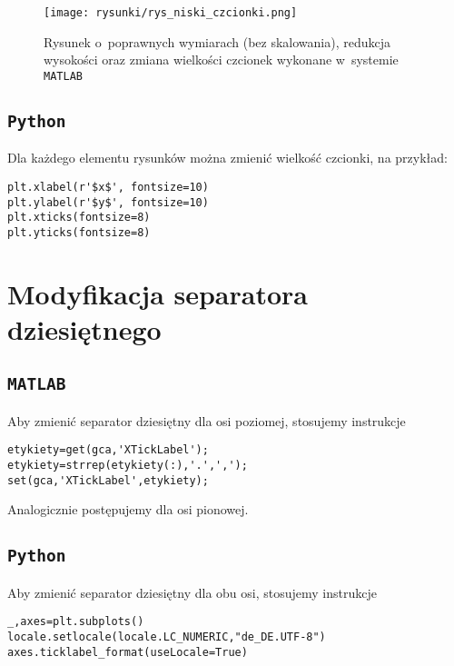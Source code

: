 \begin{figure}[H]
\centering
\texttt{[image: rysunki/rys\_niski\_czcionki.png]}
\caption{Rysunek o~poprawnych wymiarach (bez skalowania), redukcja wysokości oraz zmiana wielkości czcionek wykonane w~systemie \texttt{MATLAB}}
\label{r_niski_czcionki}
\end{figure}

\subsection{\texttt{Python}}
Dla każdego elementu rysunków można zmienić wielkość czcionki, na przykład:
\begin{lstlisting}[style=custompython,frame=single]
plt.xlabel(r'$x$', fontsize=10)
plt.ylabel(r'$y$', fontsize=10)
plt.xticks(fontsize=8)
plt.yticks(fontsize=8)
\end{lstlisting}

\section{Modyfikacja separatora dziesiętnego}
\subsection{\texttt{MATLAB}}
Aby zmienić separator dziesiętny dla osi poziomej, stosujemy instrukcje
\begin{lstlisting}[style=custommatlab,frame=single]
etykiety=get(gca,'XTickLabel');
etykiety=strrep(etykiety(:),'.',',');
set(gca,'XTickLabel',etykiety);
\end{lstlisting}
Analogicznie postępujemy dla osi pionowej.

\subsection{\texttt{Python}}
Aby zmienić separator dziesiętny dla obu osi, stosujemy instrukcje
\begin{lstlisting}[style=custompython,frame=single]
_,axes=plt.subplots()
locale.setlocale(locale.LC_NUMERIC,"de_DE.UTF-8")
axes.ticklabel_format(useLocale=True)
\end{lstlisting}




